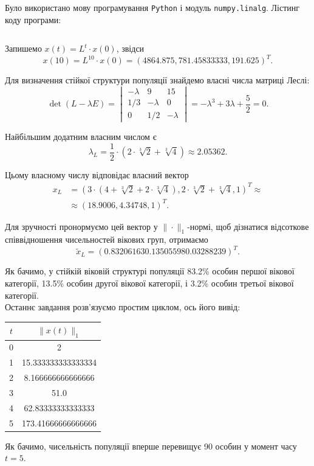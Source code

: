Було використано мову програмування \texttt{Python} і модуль \texttt{numpy.linalg}. Лістинг коду програми:
\inputminted{python}{2.py}

Запишемо $x(t) = L^t \cdot x(0)$, звідси \[ x(10) = L^{10} \cdot x(0) = (4864.875, 781.45833333, 191.625)^T. \]

Для визначення стійкої структури популяції знайдемо власні числа матриці Леслі: \[ \det (L - \lambda E) = \begin{vmatrix} -\lambda & 9 & 15 \\ 1 / 3 & -\lambda & 0 \\ 0 & 1 / 2 & -\lambda \end{vmatrix} = - \lambda^3 + 3 \lambda + \frac{5}{2} = 0. \]

Найбільшим додатним власним числом є \[ \lambda_L = \frac{1}{2} \cdot \left( 2 \cdot \sqrt[3]{2} + \sqrt[3]{4} \right) \approx 2.05362. \]

Цьому власному числу відповідає власний вектор \begin{align*} x_L &= \left( 3 \cdot \left( 4 + \sqrt[3]{2} + 2 \cdot \sqrt[3]{4} \right), 2 \cdot \sqrt[3]{2} + \sqrt[3]{4}, 1 \right)^T \approx \\ &\approx (18.9006, 4.34748, 1)^T. \end{align*}

Для зручності пронормуємо цей вектор у $\|\cdot\|_1$-нормі, щоб дізнатися відсоткове співвідношення чисельностей вікових груп, отримаємо \[ \tilde x_L = (0.83206163 0.13505598 0.03288239)^T. \]

Як бачимо, у стійкій віковій структурі популяції 83.2\% особин першої вікової категорії, 13.5\% особин другої вікової категорії, і 3.2\% особин третьої вікової категорії. \\

Останнє завдання розв'язуємо простим циклом, ось його вивід:
\begin{table}[H]
	\centering
	\begin{tabular}{|c|c|} \hline
		$t$ & $\|x(t)\|_1$ \\ \hline
		0 & 2 \\ \hline
		1 & 15.333333333333334 \\ \hline
		2 & 8.166666666666666 \\ \hline
		3 & 51.0 \\ \hline
		4 & 62.83333333333333 \\ \hline
		5 & 173.41666666666666 \\ \hline
	\end{tabular}
\end{table}

Як бачимо, чисельність популяції вперше перевищує 90 особин у момент часу $t = 5$.

